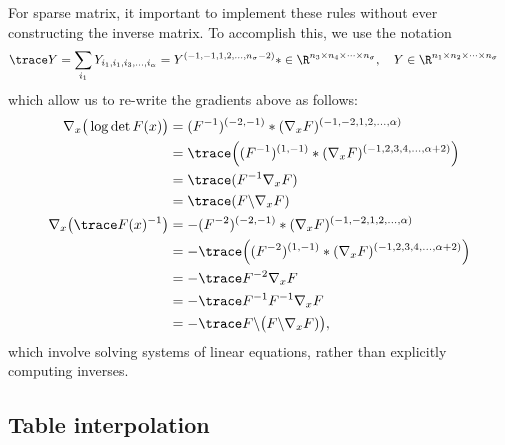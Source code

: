 \documentclass[11pt]{article}
\theoremstyle{remark}
\begin{document}
For sparse matrix, it important to implement these rules without ever
constructing the inverse matrix. To accomplish this, we use the notation
\begin{align*}
  &\trace Y = \sum_{i_1} Y_{i_1,i_1,i_3,\dots,i_\alpha} = Y^{(-1,-1,1,2,\dots,n_\sigma-2)} *\in\R^{n_3\times n_4 \times\cdots \times n_\sigma},
  \quad
  Y\in\R^{n_1\times n_2 \times\cdots \times n_\sigma}
\end{align*}
which allow us to re-write the gradients above as follows:
\begin{align*}
  \nabla_x \big(\log\det F (x)\big)
  &= (F^{-1})^{(-2,-1)} * (\nabla_x F)^{(-1,-2,1,2,\dots,\alpha)} \\
  &=\trace \Big((F^{-1})^{(1,-1)} * (\nabla_x F)^{(-1,2,3,4,\dots,\alpha+2)}\Big)\\
  &=\trace (F^{-1} \nabla_x F)\\
  &=\trace(F\backslash \nabla_x F)\\
  \nabla_x \big(\trace F(x)^{-1}\big)
  &= -(F^{-2})^{(-2,-1)} * (\nabla_x F)^{(-1,-2,1,2,\dots,\alpha)} \\
  &= -\trace\Big((F^{-2})^{(1,-1)} *( \nabla_x F)^{(-1,2,3,4,\dots,\alpha+2)}\Big) \\
  &= -\trace F^{-2} \nabla_x F\\
  &= -\trace F^{-1}F^{-1} \nabla_x F\\
  &= -\trace F\backslash\big( F\backslash\nabla_x F)\big),
\end{align*}
which involve solving systems of linear equations, rather than
explicitly computing inverses.

\subsection{Table interpolation}
\end{document}
